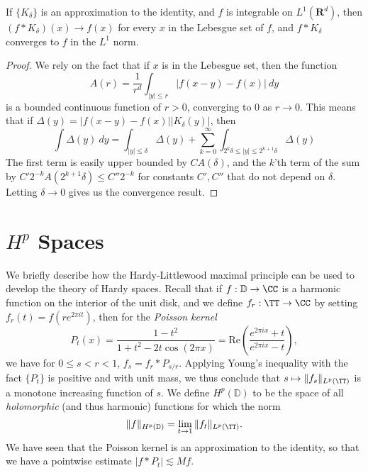 \begin{theorem}
    If $\{ K_\delta \}$ is an approximation to the identity, and $f$ is integrable on $L^1(\mathbf{R}^d)$, then $(f * K_\delta)(x) \to f(x)$ for every $x$ in the Lebesgue set of $f$, and $f * K_\delta$ converges to $f$ in the $L^1$ norm.
\end{theorem}
\begin{proof}
    We rely on the fact that if $x$ is in the Lebesgue set, then the function
    \[ A(r) = \frac{1}{r^d} \int_{|y| \leq r} |f(x-y) - f(x)|\ dy \]
    is a bounded continuous function of $r > 0$, converging to $0$ as $r \to 0$. This means that if $\Delta(y) = |f(x-y) - f(x)| |K_\delta(y)|$, then
    \[ \int \Delta(y)\ dy = \int_{|y| \leq \delta} \Delta(y) + \sum_{k = 0}^\infty \int_{2^k \delta \leq |y| \leq 2^{k+1} \delta} \Delta(y) \]
    The first term is easily upper bounded by $CA(\delta)$, and the $k$'th term of the sum by $C'2^{-k}A(2^{k+1}\delta) \leq C''2^{-k}$ for constants $C',C''$ that do not depend on $\delta$. Letting $\delta \to 0$ gives us the convergence result.
\end{proof}

\section{$H^p$ Spaces}

We briefly describe how the Hardy-Littlewood maximal principle can be used to develop the theory of Hardy spaces. Recall that if $f: \mathbb{D} \to \CC$ is a harmonic function on the interior of the unit disk, and we define $f_r: \TT \to \CC$ by setting $f_r(t) = f(r e^{2 \pi it})$, then for the \emph{Poisson kernel}
%
\[ P_t(x) = \frac{1 - t^2}{1 + t^2 - 2t \cos(2 \pi x)} = \text{Re} \left( \frac{e^{2 \pi i x} + t}{e^{2 \pi i x} - t} \right), \]
%
we have for $0 \leq s < r < 1$, $f_s = f_r * P_{s/r}$. Applying Young's inequality with the fact $\{ P_t \}$ is positive and with unit mass, we thus conclude that $s \mapsto \| f_s \|_{L^p(\TT)}$ is a monotone increasing function of $s$. We define $H^p(\mathbb{D})$ to be the space of all \emph{holomorphic} (and thus harmonic) functions for which the norm
%
\[ \| f \|_{H^p(\mathbb{D})} = \lim_{t \to 1} \| f_t \|_{L^p(\TT)}. \]
%
We have seen that the Poisson kernel is an approximation to the identity, so that we have a pointwise estimate $|f * P_t| \lesssim Mf$.

